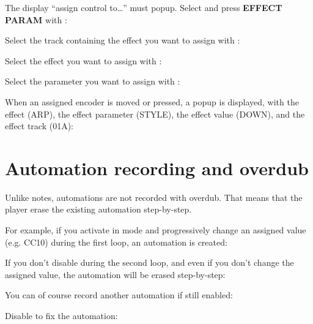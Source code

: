The display ``assign control to\ldots'' must popup. Select and press \textbf{EFFECT PARAM} with \encodericon{}:


Select the track containing the effect you want to assign with \encodericon{}:


Select the effect you want to assign with \encodericon{}:


Select the parameter you want to assign with \encodericon{}:



When an assigned encoder is moved or pressed, a popup is displayed, with the effect (ARP), the effect parameter (STYLE), the effect value (DOWN), and the effect track (01A):


\section{Automation recording and overdub}

Unlike notes, automations are not recorded with overdub. That means that the player erase the existing automation step-by-step.

For example, if you activate  in  mode and progressively change an assigned value (e.g. CC10) during the first loop, an automation is created:


If you don't disable  during the second loop, and even if you don't change the assigned value, the automation will be erased step-by-step:


You can of course record another automation if  still enabled:


Disable  to fix the automation:


